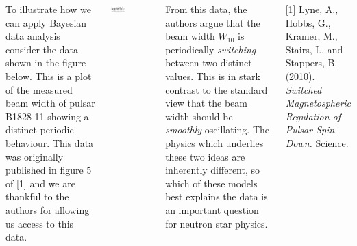 \documentclass[20pt, a1paper, portrait, margin=5mm, innermargin=8mm,
               blockverticalspace=8mm,colspace=5mm, subcolspace=0mm]
               {tikzposter}
\begin{document}
\begin{columns}
{To illustrate how we can apply Bayesian data analysis consider the data
shown in the figure below. This is a plot of the measured beam width
of pulsar B1828-11 showing a distinct periodic behaviour. This data was 
originally published in figure 5 of [1] and we are thankful
to the authors for allowing us access to this data.
\begin{tikzfigure}
    \centering
    \includegraphics[trim=0mm 3mm 0mm 7mm,clip=true, width=0.37\textwidth]{img/raw_data}
\end{tikzfigure}
From this data, the authors argue that the beam width $W_{10}$ is
periodically \emph{switching}
between two distinct values. This is in stark contrast to the standard view that
the beam width should be \emph{smoothly} oscillating. 
The physics which underlies these two ideas are inherently different, so which
of these models best explains the data is an important question for neutron star physics.

\vspace{5mm}
\small
[1] Lyne, A., Hobbs, G., Kramer, M., Stairs, I., and Stappers, B. (2010). 
\emph{Switched Magnetospheric Regulation of Pulsar Spin-Down.} Science.
}

\end{columns}

\begin{columns}


\end{columns}
\end{document}

